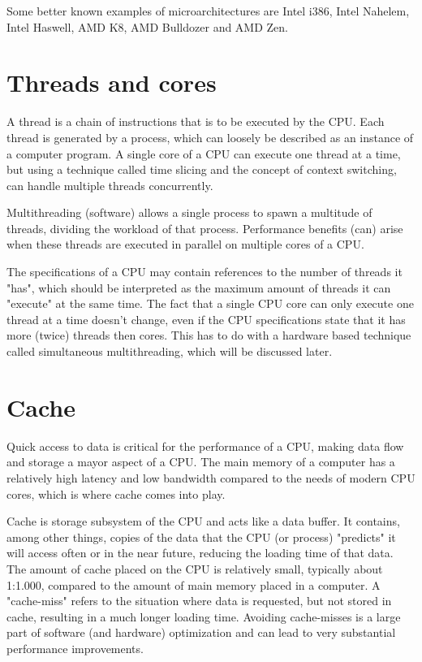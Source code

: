 Some better known examples of microarchitectures are Intel i386, Intel Nahelem, Intel Haswell, AMD K8, AMD Bulldozer and AMD Zen. 

\newpage

\section{Threads and cores}

\hspace{4mm}A thread is a chain of instructions that is to be executed by the CPU\autocite[]{wiki_thread}. Each thread is generated by a process, which can loosely be described as an instance of a computer program. A single core of a CPU can execute one thread at a time, but using a technique called time slicing and the concept of context switching\autocite[]{wiki_cs}, can handle multiple threads concurrently.\vspace{5mm}

Multithreading (software) allows a single process to spawn a multitude of threads, dividing the workload of that process. Performance benefits (can) arise when these threads are executed in parallel on multiple cores of a CPU.\vspace{5mm}

The specifications of a CPU may contain references to the number of threads it "has", which should be interpreted as the maximum amount of threads it can "execute" at the same time. The fact that a single CPU core can only execute one thread at a time doesn't change, even if the CPU specifications state that it has more (twice) threads then cores. This has to do with a hardware based technique called simultaneous multithreading\autocite[]{wiki_smt}, which will be discussed later.

\section{Cache}

\hspace{4mm}Quick access to data is critical for the performance of a CPU, making data flow and storage a mayor aspect of a CPU. The main memory of a computer has a relatively high latency and low bandwidth compared to the needs of modern CPU cores, which is where cache comes into play\autocite[]{wiki_cache}.\vspace{5mm}

Cache is storage subsystem of the CPU and acts like a data buffer. It contains, among other things, copies of the data that the CPU (or process) "predicts" it will access often or in the near future, reducing the loading time of that data. The amount of cache placed on the CPU is relatively small, typically about 1:1.000, compared to the amount of main memory placed in a computer. A "cache-miss" refers to the situation where data is requested, but not stored in cache, resulting in a much longer loading time. Avoiding cache-misses is a large part of software (and hardware) optimization and can lead to very substantial performance improvements.\vspace{5mm}

